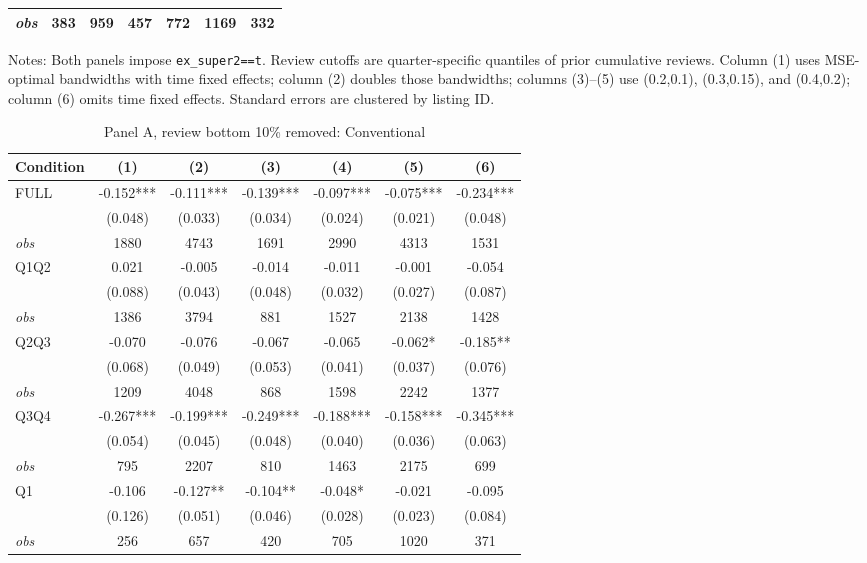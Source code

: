 \begin{table}[!htbp]
\begin{tabular}{lcccccc}
\textit{obs} & 383 & 959 & 457 & 772 & 1169 & 332 \\
\bottomrule
\end{tabular}
\begin{minipage}{0.98\textwidth}\footnotesize
Notes: Both panels impose \texttt{ex\_super2==t}. Review cutoffs are quarter-specific quantiles of prior cumulative reviews. Column (1) uses MSE-optimal bandwidths with time fixed effects; column (2) doubles those bandwidths; columns (3)--(5) use (0.2,0.1), (0.3,0.15), and (0.4,0.2); column (6) omits time fixed effects. Standard errors are clustered by listing ID.
\end{minipage}
\end{table}

\begin{table}[!htbp]
\centering
\caption{Panel A, review bottom 10\% removed: Conventional}
\begin{tabular}{lcccccc}
\toprule
Condition & (1) & (2) & (3) & (4) & (5) & (6) \\
\midrule
FULL & -0.152*** & -0.111*** & -0.139*** & -0.097*** & -0.075*** & -0.234*** \\
 & (0.048) & (0.033) & (0.034) & (0.024) & (0.021) & (0.048) \\
\textit{obs} & 1880 & 4743 & 1691 & 2990 & 4313 & 1531 \\
Q1Q2 & 0.021 & -0.005 & -0.014 & -0.011 & -0.001 & -0.054 \\
 & (0.088) & (0.043) & (0.048) & (0.032) & (0.027) & (0.087) \\
\textit{obs} & 1386 & 3794 & 881 & 1527 & 2138 & 1428 \\
Q2Q3 & -0.070 & -0.076 & -0.067 & -0.065 & -0.062* & -0.185** \\
 & (0.068) & (0.049) & (0.053) & (0.041) & (0.037) & (0.076) \\
\textit{obs} & 1209 & 4048 & 868 & 1598 & 2242 & 1377 \\
Q3Q4 & -0.267*** & -0.199*** & -0.249*** & -0.188*** & -0.158*** & -0.345*** \\
 & (0.054) & (0.045) & (0.048) & (0.040) & (0.036) & (0.063) \\
\textit{obs} & 795 & 2207 & 810 & 1463 & 2175 & 699 \\
Q1 & -0.106 & -0.127** & -0.104** & -0.048* & -0.021 & -0.095 \\
 & (0.126) & (0.051) & (0.046) & (0.028) & (0.023) & (0.084) \\
\textit{obs} & 256 & 657 & 420 & 705 & 1020 & 371 \\

\end{tabular}
\end{table}

